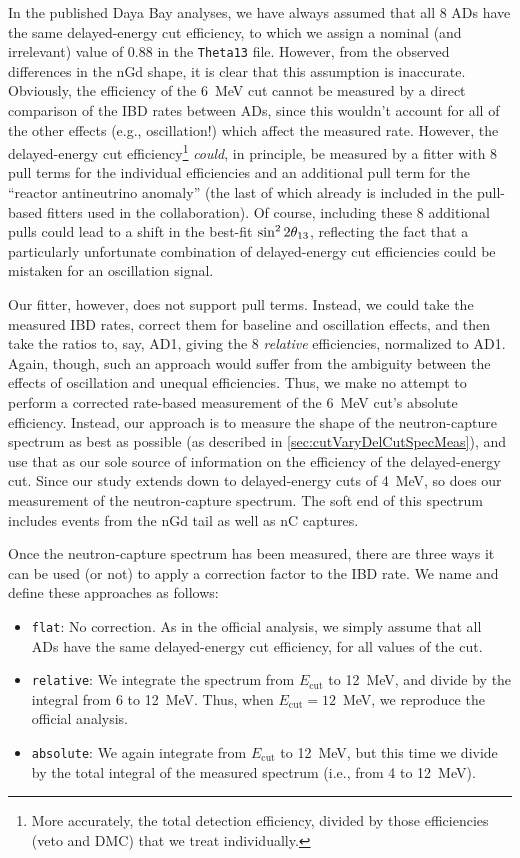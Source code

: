 \documentclass[../thesis.tex]{subfiles}
\begin{document}
In the published Daya Bay analyses, we have always assumed that all 8 ADs have the same delayed-energy cut efficiency, to which we assign a nominal (and irrelevant) value of 0.88 in the \texttt{Theta13} file. However, from the observed differences in the nGd shape, it is clear that this assumption is inaccurate. Obviously, the efficiency of the 6~MeV cut cannot be measured by a direct comparison of the IBD rates between ADs, since this wouldn't account for all of the other effects (e.g., oscillation!) which affect the measured rate. However, the delayed-energy cut efficiency\footnote{More accurately, the total detection efficiency, divided by those efficiencies (veto and DMC) that we treat individually.} \emph{could}, in principle, be measured by a fitter with 8 pull terms for the individual efficiencies and an additional pull term for the ``reactor antineutrino anomaly'' (the last of which already is included in the pull-based fitters used in the collaboration). Of course, including these 8 additional pulls could lead to a shift in the best-fit $\sin^2 2\theta_{13}$, reflecting the fact that a particularly unfortunate combination of delayed-energy cut efficiencies could be mistaken for an oscillation signal.

Our fitter, however, does not support pull terms. Instead, we could take the measured IBD rates, correct them for baseline and oscillation effects, and then take the ratios to, say, AD1, giving the 8 \emph{relative} efficiencies, normalized to AD1. Again, though, such an approach would suffer from the ambiguity between the effects of oscillation and unequal efficiencies. Thus, we make no attempt to perform a corrected rate-based measurement of the 6~MeV cut's absolute efficiency. Instead, our approach is to measure the shape of the neutron-capture spectrum as best as possible (as described in \autoref{sec:cutVaryDelCutSpecMeas}), and use that as our sole source of information on the efficiency of the delayed-energy cut. Since our study extends down to delayed-energy cuts of 4~MeV, so does our measurement of the neutron-capture spectrum. The soft end of this spectrum includes events from the nGd tail as well as nC captures.

Once the neutron-capture spectrum has been measured, there are three ways it can be used (or not) to apply a correction factor to the IBD rate. We name and define these approaches as follows:

\begin{itemize}
\item \texttt{flat}: No correction. As in the official analysis, we simply assume that all ADs have the same delayed-energy cut efficiency, for all values of the cut.
\item \texttt{relative}: We integrate the spectrum from $E_{\mathrm{cut}}$ to 12~MeV, and divide by the integral from 6 to 12~MeV. Thus, when $E_{\mathrm{cut}} = 12$~MeV, we reproduce the official analysis.
\item \texttt{absolute}: We again integrate from $E_{\mathrm{cut}}$ to 12~MeV, but this time we divide by the total integral of the measured spectrum (i.e., from 4 to 12~MeV).
\end{itemize}
\end{document}
